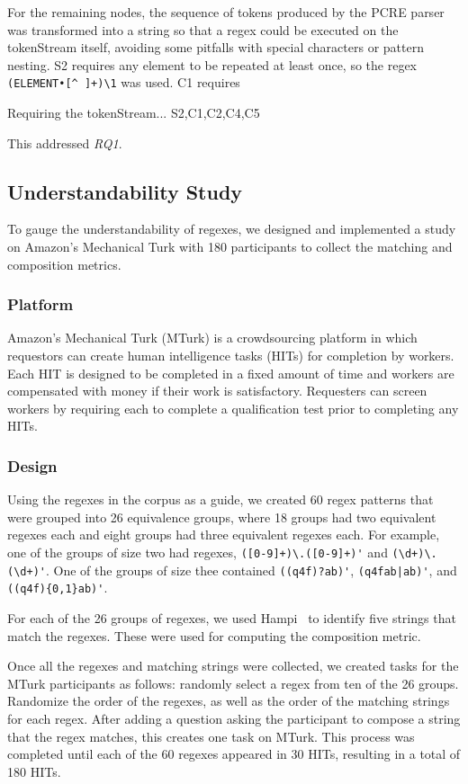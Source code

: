 For the remaining nodes, the sequence of tokens produced by the PCRE parser was transformed into a string so that a regex could be executed on the tokenStream itself, avoiding some pitfalls with special characters or pattern nesting.  S2 requires any element to be repeated at least once, so the regex \verb!(ELEMENT•[^ ]+)\1! was used.  C1 requires

Requiring the tokenStream...
S2,C1,C2,C4,C5



This addressed \emph{RQ1}.

\subsection{Understandability Study}
To gauge the understandability of regexes, we designed and implemented a study on Amazon's Mechanical Turk with 180 participants to collect the matching and composition metrics.

\subsubsection{Platform}
Amazon's Mechanical Turk (MTurk) is a crowdsourcing platform in which requestors can create human intelligence tasks (HITs) for completion by workers. Each HIT is designed to be completed in a fixed amount of time and workers are compensated with money if their work is satisfactory. Requesters can screen workers by requiring each to complete a qualification test prior to completing any HITs.

\subsubsection{Design}
Using the regexes in the corpus as a guide, we created 60 regex patterns that were grouped into 26 equivalence groups, where 18 groups had two equivalent regexes each and eight groups had three equivalent regexes each. For example, one of the groups of size two had regexes, \verb!([0-9]+)\.([0-9]+)'! and \verb!(\d+)\.(\d+)'!. One of the groups of size thee contained \verb!((q4f)?ab)'!, \verb!(q4fab|ab)'!, and \verb!((q4f){0,1}ab)'!.

For each of the 26 groups of regexes, we used Hampi~\cite{hampi} to identify five strings that match the regexes. These were used for computing the composition metric.

Once all the regexes and matching strings were collected, we created tasks for the MTurk participants as follows: randomly select a regex from ten of the 26 groups. Randomize the order of the regexes, as well as the order of the matching strings for each regex. After adding a question asking the participant to compose a string that the regex matches, this creates one task on MTurk. This process was completed until each of the 60 regexes appeared in 30 HITs, resulting in a total of 180 HITs.

